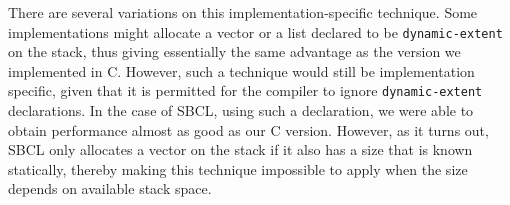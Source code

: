 There are several variations on this implementation-specific
technique.  Some implementations might allocate a vector or a list
declared to be \texttt{dynamic-extent} on the stack, thus giving
essentially the same advantage as the version we implemented in C.
However, such a technique would still be implementation specific,
given that it is permitted for the compiler to ignore
\texttt{dynamic-extent} declarations.  In the case of SBCL, using such
a declaration, we were able to obtain performance almost as good as
our C version.  However, as it turns out, SBCL only allocates a vector
on the stack if it also has a size that is known statically, thereby
making this technique impossible to apply when the size depends on
available stack space.
